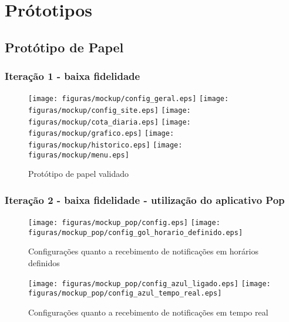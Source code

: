 \chapter[Prótotipos]{Prótotipos}

\section[Protótipo de Papel]{Protótipo de Papel}
\subsection{Iteração 1 - baixa fidelidade}

	\begin{figure}[h]
		\centering
			\texttt{[image: figuras/mockup/config\_geral.eps]}
			\texttt{[image: figuras/mockup/config\_site.eps]}
			\texttt{[image: figuras/mockup/cota\_diaria.eps]}
			\texttt{[image: figuras/mockup/grafico.eps]}
			\texttt{[image: figuras/mockup/historico.eps]}
			\texttt{[image: figuras/mockup/menu.eps]}
		\caption{Protótipo de papel validado}
		\label{fig03}
	\end{figure}

\subsection{Iteração 2 - baixa fidelidade - utilização do aplicativo Pop}

	\begin{figure}[h]
		\centering
			\texttt{[image: figuras/mockup\_pop/config.eps]}
			\texttt{[image: figuras/mockup\_pop/config\_gol\_horario\_definido.eps]}
		\caption{Configurações quanto a recebimento de notificações em horários definidos}
	\end{figure}


	\begin{figure}[h]
		\centering
			\texttt{[image: figuras/mockup\_pop/config\_azul\_ligado.eps]}
			\texttt{[image: figuras/mockup\_pop/config\_azul\_tempo\_real.eps]}
		\caption{Configurações quanto a recebimento de notificações em tempo real}
	\end{figure}

